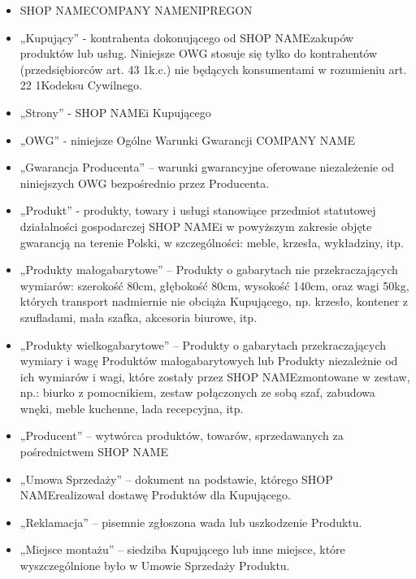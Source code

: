 \documentclass[10pt,a4paper]{article}
\newcommand{\shopname}{SHOP NAME}
\newcommand{\companyname}{COMPANY NAME}
\newcommand{\regon}{REGON}
\newcommand{\nip}{NIP}
\begin{document}
\begin{itemize}

\item \shopname \companyname \nip \regon

\item „Kupujący” - kontrahenta dokonującego od \shopname zakupów produktów lub usług. Niniejsze OWG stosuje się tylko do
kontrahentów (przedsiębiorców art. 43 1k.c.) nie będących konsumentami w rozumieniu art. 22 1Kodeksu Cywilnego.

\item „Strony” - \shopname i Kupującego

\item „OWG” - niniejsze Ogólne Warunki Gwarancji \companyname

\item „Gwarancja Producenta” – warunki gwarancyjne oferowane niezależenie od niniejszych OWG bezpośrednio przez Producenta.

\item „Produkt” - produkty, towary i usługi stanowiące przedmiot statutowej działalności gospodarczej \shopname i w powyższym zakresie
objęte gwarancją na terenie Polski, w szczególności: meble, krzesła, 
wykładziny, itp.

\item „Produkty małogabarytowe” – Produkty o gabarytach nie przekraczających wymiarów: szerokość 80cm, głębokość 80cm, wysokość
140cm, oraz wagi 50kg, których transport nadmiernie nie obciąża Kupującego, np. krzesło, kontener z szufladami, mała szafka,
akcesoria biurowe, itp.

\item „Produkty wielkogabarytowe” – Produkty o gabarytach przekraczających wymiary i wagę Produktów małogabarytowych lub
Produkty niezależnie od ich wymiarów i wagi, które zostały przez \shopname zmontowane w zestaw, np.: biurko z pomocnikiem,
zestaw połączonych ze sobą szaf, zabudowa wnęki, meble kuchenne, lada recepcyjna, itp.

\item „Producent” – wytwórca produktów, towarów, sprzedawanych za pośrednictwem \shopname

\item „Umowa Sprzedaży” – dokument na podstawie, którego \shopname realizował dostawę Produktów dla Kupującego.

\item „Reklamacja” – pisemnie zgłoszona wada lub uszkodzenie Produktu.

\item „Miejsce montażu” – siedziba Kupującego lub inne miejsce, które wyszczególnione było w Umowie Sprzedaży Produktu. 

\end{itemize}
\end{document}
